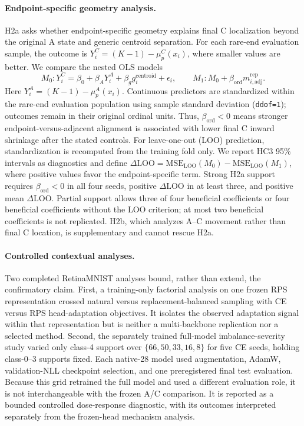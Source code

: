 \paragraph{Endpoint-specific geometry analysis.}
H2a asks whether endpoint-specific geometry explains final C localization beyond the original A state and generic centroid separation. For each rare-end evaluation sample, the outcome is \(Y_i^C=(K-1)-\mu_p^C(x_i)\), where smaller values are better. We compare the nested OLS models
\[
M_0: Y_i^C=\beta_0+\beta_A Y_i^A+\beta_g g_i^{\mathrm{centroid}}+\epsilon_i,
\qquad M_1: M_0+\beta_{\mathrm{ord}}m_{i,\mathrm{adj}}^{\mathrm{rep}}.
\]
Here \(Y_i^A=(K-1)-\mu_p^A(x_i)\). Continuous predictors are standardized within the rare-end evaluation population using sample standard deviation (\texttt{ddof=1}); outcomes remain in their original ordinal units. Thus, \(\beta_{\mathrm{ord}}<0\) means stronger endpoint-versus-adjacent alignment is associated with lower final C inward shrinkage after the stated controls. For leave-one-out (LOO) prediction, standardization is recomputed from the training fold only. We report HC3 95\% intervals as diagnostics and define \(\Delta\mathrm{LOO}=\mathrm{MSE}_{\mathrm{LOO}}(M_0)-\mathrm{MSE}_{\mathrm{LOO}}(M_1)\), where positive values favor the endpoint-specific term. Strong H2a support requires \(\beta_{\mathrm{ord}}<0\) in all four seeds, positive \(\Delta\mathrm{LOO}\) in at least three, and positive mean \(\Delta\mathrm{LOO}\). Partial support allows three of four beneficial coefficients or four beneficial coefficients without the LOO criterion; at most two beneficial coefficients is not replicated. H2b, which analyzes A--C movement rather than final C location, is supplementary and cannot rescue H2a.

\paragraph{Controlled contextual analyses.}
Two completed RetinaMNIST analyses bound, rather than extend, the confirmatory claim. First, a training-only factorial analysis on one frozen RPS representation crossed natural versus replacement-balanced sampling with CE versus RPS head-adaptation objectives. It isolates the observed adaptation signal within that representation but is neither a multi-backbone replication nor a selected method. Second, the separately trained full-model imbalance-severity study varied only class-4 support over \(\{66,50,33,16,8\}\) for five CE seeds, holding class-0--3 supports fixed. Each native-28 model used augmentation, AdamW, validation-NLL checkpoint selection, and one preregistered final test evaluation. Because this grid retrained the full model and used a different evaluation role, it is not interchangeable with the frozen A/C comparison. It is reported as a bounded controlled dose-response diagnostic, with its outcomes interpreted separately from the frozen-head mechanism analysis.
